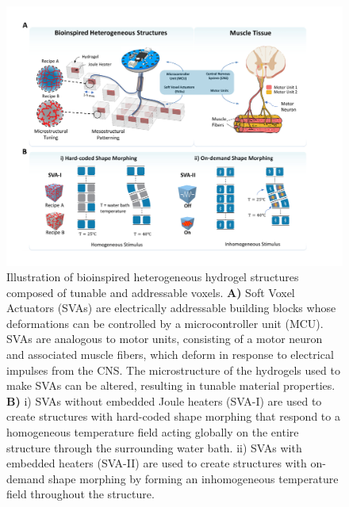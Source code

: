 \begin{figure}[t]
\centering
\includegraphics[width=\textwidth]{fig1.pdf}
\caption{Illustration of bioinspired heterogeneous hydrogel structures composed of tunable and addressable voxels. \textbf{A)} Soft Voxel Actuators (SVAs) are electrically addressable building blocks whose deformations can be controlled by a microcontroller unit (MCU). SVAs are analogous to motor units, consisting of a motor neuron and associated muscle fibers, which deform in response to electrical impulses from the CNS. The microstructure of the hydrogels used to make SVAs can be altered, resulting in tunable material properties. \textbf{B)} i) SVAs without embedded Joule heaters (SVA-I) are used to create structures with hard-coded shape morphing that respond to a homogeneous temperature field acting globally on the entire structure through the surrounding water bath. ii) SVAs with embedded heaters (SVA-II) are used to create structures with on-demand shape morphing by forming an inhomogeneous temperature field throughout the structure.}
\label{fig:1}
\end{figure}

